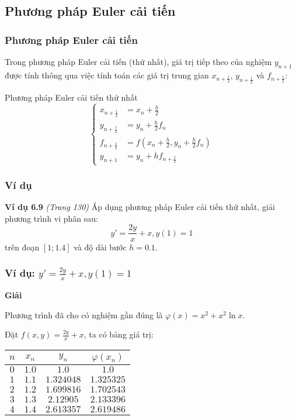\begin{frame}
	\subsection{Phương pháp Euler cải tiến}
	\frametitle{Phương pháp Euler cải tiến}
	Trong phương pháp Euler cải tiến (thứ nhất), giá trị tiếp theo của nghiệm $y_{n+1}$ được tính thông qua việc tính toán các giá trị trung gian $x_{n+\frac12}$, $y_{n+\frac12}$ và $f_{n+\frac12}$:\par
	\begin{block}{Phương pháp Euler cải tiến thứ nhất}
	\begin{equation}\label{eqn:eqn618}\begin{cases}
		x_{n+\frac12}&=x_n+\frac h2\\
		y_{n+\frac12}&=y_n+\frac h2f_n\\
		f_{n+\frac12}&=f\left(x_n+\frac h2, y_n+\frac h2f_n\right)\\
		y_{n+1}&=y_n+hf_{n+\frac12}
	\end{cases}\end{equation}
	\end{block}
\end{frame}
\begin{frame}
	\frametitle{Ví dụ}
	\textbf{Ví dụ 6.9} \textit{(Trang 130)} Áp dụng phương pháp Euler cải tiến thứ nhất, giải phương trình vi phân sau:
	$$y'=\frac{2y}{x}+x,y(1)=1$$
	trên đoạn $[1;1.4]$ và độ dài bước $h=0.1$.\par
\end{frame}
\begin{frame}
	\frametitle{Ví dụ: $y'=\frac{2y}{x}+x,y(1)=1$}
	\textbf{Giải}\par
	Phương trình đã cho có nghiệm gần đúng là $\varphi(x)=x^2+x^2\ln x$.\par
	Đặt $f(x,y)=\frac{2y}{x}+x$, ta có bảng giá trị:\par
	\begin{table}\begin{tabular}{|c|c|c|c|}\hline
		$n$ & $x_n$ & $y_n$      & $\varphi(x_n)$ \\ \hline
		$0$ & $1.0$ & $1.0$      & $1.0$          \\ \hline
		$1$ & $1.1$ & $1.324048$ & $1.325325$     \\ \hline
		$2$ & $1.2$ & $1.699816$ & $1.702543$     \\ \hline
		$3$ & $1.3$ & $2.12905$  & $2.133396$     \\ \hline
		$4$ & $1.4$ & $2.613357$ & $2.619486$     \\ \hline
	\end{tabular}\end{table}
\end{frame}
